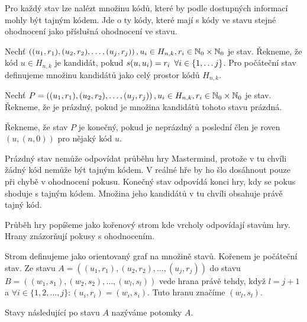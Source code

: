 
Pro každý stav lze nalézt množinu kódů, které by podle dostupných informací mohly být tajným kódem. Jde o ty kódy, které mají s kódy ve stavu stejné ohodnocení jako příslušná ohodnocení ve stavu. 

\begin{definice}[kandidát]\label{kandidat}
  Nechť $\left((u_1, r_1), (u_2,r_2), \dots, (u_j,r_j)\right), u_i \in H_{n,k}, r_i \in \mathbb{N} _0 \times \mathbb{N} _0$ je stav. Řekneme, že kód $u \in H_{n,k}$ je kandidát, pokud $s(u,u_i) = r_i \hspace{5px} \forall i \in \{1, \dots j\}$. Pro počáteční stav definujeme množinu kandidátů jako celý prostor kódů $H_{n,k}$.
\end{definice}


\begin{definice}\label{kandidat}
  Nechť $P = \left((u_1, r_1), (u_2,r_2), \dots, (u_j,r_j)\right), u_i \in H_{n,k}, r_i \in \mathbb{N} _0 \times \mathbb{N} _0$ je stav. Řekneme, že je prázdný, pokud je množina kandidátů tohoto stavu prázdná. 

  Řekneme, že stav $P$ je konečný, pokud je neprázdný a poslední člen je roven $(u,(n,0))$ pro nějaký kód $u$.
\end{definice}

Prázdný stav nemůže odpovídat průběhu hry Mastermind, protože v tu chvíli žádný kód nemůže být tajným kódem. V reálné hře by ho šlo dosáhnout pouze při chybě v ohodnocení pokusu. Konečný stav odpovídá konci hry, kdy se pokus shoduje s tajným kódem. Množina jeho kandidátů v tu chvíli obsahuje právě tajný kód. 

Průběh hry popíšeme jako kořenový strom kde vrcholy odpovídají stavům hry. Hrany znázorňují pokusy s ohodnocením. 

\begin{definice}
  Strom  definujeme jako orientovaný graf na množině stavů. Kořenem je počáteční stav. Ze stavu $A = \left((u_1, r_1), (u_2,r_2), \dots, (u_j,r_j)\right)$ do stavu $B = \left((w_1, s_1), (w_2,s_2), \dots, (w_l,s_l)\right)$ vede hrana právě tehdy, když $l = j+1$ a $\forall i \in \{1,2,\dots, j\} \colon (u_i, r_i) = (w_i, s_i)$. Tuto hranu značíme $(w_l, s_l)$. 
\end{definice}

Stavy následující po stavu $A$ nazýváme potomky $A$.

